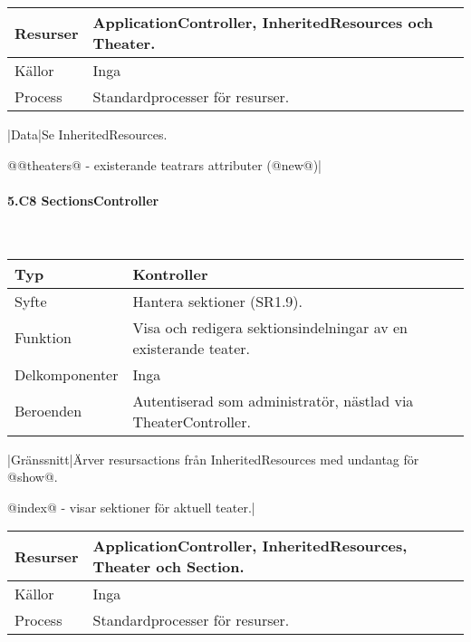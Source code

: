 \documentclass[a4paper, twoside, 11pt, titlepage]{article}
\begin{document}
			\begin {table} [ht] \begin{tabular} {  p{3.5cm} p{9.6cm} }
				\hline
				Resurser & ApplicationController, InheritedResources och Theater.  \\
				\hline
				Källor & Inga  \\
				\hline
				Process & Standardprocesser för resurser.  \\
				\hline
			\end{tabular} \end{table} \FloatBarrier
			\vspace{6mm}

			|Data|Se InheritedResources.

			@@theaters@ - existerande teatrars attributer (@new@)|

			\paragraph{5.C8 SectionsController}\

			\begin {table} [ht] \begin{tabular} {  p{3.5cm} p{9.6cm} }
				\hline
				Typ & Kontroller  \\
				\hline
				Syfte & Hantera sektioner (SR1.9).  \\
				\hline
				Funktion & Visa och redigera sektionsindelningar av en existerande teater.  \\
				\hline
				Delkomponenter & Inga  \\
				\hline
				Beroenden & Autentiserad som administratör, nästlad via TheaterController.  \\
				\hline
			\end{tabular} \end{table} \FloatBarrier
			\vspace{6mm}

			|Gränssnitt|Ärver resursactions från InheritedResources med undantag för @show@.

			@index@ - visar sektioner för aktuell teater.|

			\begin {table} [ht] \begin{tabular} {  p{3.5cm} p{9.6cm} }
				\hline
				Resurser & ApplicationController, InheritedResources, Theater och Section.  \\
				\hline
				Källor & Inga  \\
				\hline
				Process & Standardprocesser för resurser.  \\
				\hline
			\end{tabular} \end{table} \FloatBarrier
			\vspace{6mm}
\end{document}
